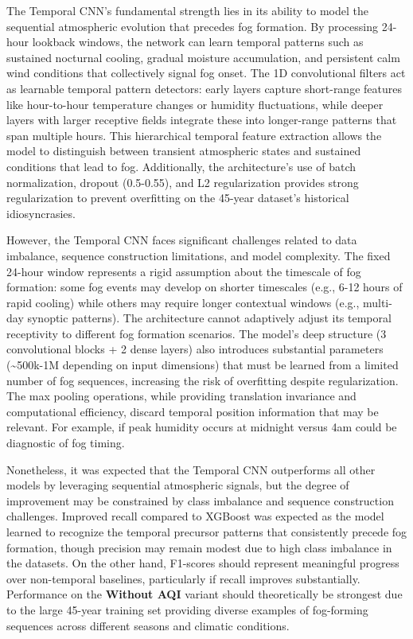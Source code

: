 \documentclass[
  letterpaper,
  DIV=11,
  numbers=noendperiod]{scrartcl}
\begin{document}
The Temporal CNN's fundamental strength lies in its ability to model the
sequential atmospheric evolution that precedes fog formation. By
processing 24-hour lookback windows, the network can learn temporal
patterns such as sustained nocturnal cooling, gradual moisture
accumulation, and persistent calm wind conditions that collectively
signal fog onset. The 1D convolutional filters act as learnable temporal
pattern detectors: early layers capture short-range features like
hour-to-hour temperature changes or humidity fluctuations, while deeper
layers with larger receptive fields integrate these into longer-range
patterns that span multiple hours. This hierarchical temporal feature
extraction allows the model to distinguish between transient atmospheric
states and sustained conditions that lead to fog. Additionally, the
architecture's use of batch normalization, dropout (0.5-0.55), and L2
regularization provides strong regularization to prevent overfitting on
the 45-year dataset's historical idiosyncrasies.

However, the Temporal CNN faces significant challenges related to data
imbalance, sequence construction limitations, and model complexity. The
fixed 24-hour window represents a rigid assumption about the timescale
of fog formation: some fog events may develop on shorter timescales
(e.g., 6-12 hours of rapid cooling) while others may require longer
contextual windows (e.g., multi-day synoptic patterns). The architecture
cannot adaptively adjust its temporal receptivity to different fog
formation scenarios. The model's deep structure (3 convolutional blocks
+ 2 dense layers) also introduces substantial parameters
(\textasciitilde500k-1M depending on input dimensions) that must be
learned from a limited number of fog sequences, increasing the risk of
overfitting despite regularization. The max pooling operations, while
providing translation invariance and computational efficiency, discard
temporal position information that may be relevant. For example, if peak
humidity occurs at midnight versus 4am could be diagnostic of fog
timing.

Nonetheless, it was expected that the Temporal CNN outperforms all other
models by leveraging sequential atmospheric signals, but the degree of
improvement may be constrained by class imbalance and sequence
construction challenges. Improved recall compared to XGBoost was
expected as the model learned to recognize the temporal precursor
patterns that consistently precede fog formation, though precision may
remain modest due to high class imbalance in the datasets. On the other
hand, F1-scores should represent meaningful progress over non-temporal
baselines, particularly if recall improves substantially. Performance on
the \textbf{Without AQI} variant should theoretically be strongest due
to the large 45-year training set providing diverse examples of
fog-forming sequences across different seasons and climatic conditions.
\end{document}
